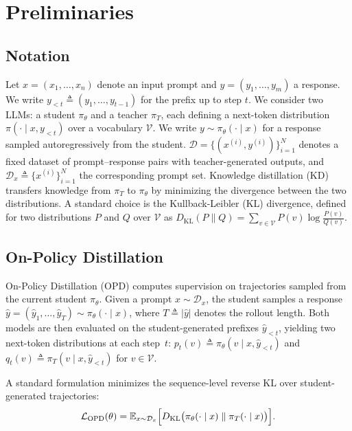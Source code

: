 \section{Preliminaries}

\subsection{Notation}

Let $x = (x_1, \ldots, x_n)$ denote an input prompt and
$y = (y_1, \ldots, y_m)$ a response.
We write $y_{<t} \triangleq (y_1, \ldots, y_{t-1})$ for the
prefix up to step $t$.
We consider two LLMs: a student $\pi_\theta$
and a teacher $\pi_T$, each defining a next-token distribution
$\pi(\cdot \mid x, y_{<t})$ over a vocabulary $\mathcal{V}$.
We write $y \sim \pi_\theta(\cdot \mid x)$ for a response
sampled autoregressively from the student.
$\mathcal{D} = \{(x^{(i)}, y^{(i)})\}_{i=1}^N$ denotes a
fixed dataset of prompt–response pairs with teacher-generated
outputs, and
$\mathcal{D}_x \triangleq \{x^{(i)}\}_{i=1}^N$ the
corresponding prompt set. Knowledge distillation (KD) transfers knowledge from $\pi_T$ to $\pi_\theta$ 
by minimizing the divergence between the two distributions. A standard choice is 
the Kullback-Leibler (KL) divergence, defined for two distributions $P$ and 
$Q$ over $\mathcal{V}$ as $D_{\mathrm{KL}}(P \| Q) 
  = \sum_{v \in \mathcal{V}} P(v) \log \frac{P(v)}{Q(v)}$.





\subsection{On-Policy Distillation}
\label{sec:on_policy_distillation}

On-Policy Distillation (OPD) computes supervision on trajectories
sampled from the current student $\pi_\theta$. Given a prompt
$x \sim \mathcal{D}_x$, the student samples a response
$\hat{y} = (\hat{y}_1, \ldots, \hat{y}_{T})
  \sim \pi_\theta(\cdot \mid x)$,
where $T \triangleq |\hat{y}|$ denotes the rollout length.
Both models are then evaluated on the student-generated prefixes
$\hat{y}_{<t}$, yielding two next-token distributions at each
step~$t$:
$p_t(v) \triangleq \pi_\theta(v \mid x, \hat{y}_{<t})$ and
$q_t(v) \triangleq \pi_T(v \mid x, \hat{y}_{<t})$
for $v \in \mathcal{V}$.


A standard formulation minimizes the sequence-level reverse KL over
student-generated trajectories:
\begin{equation}
  \mathcal{L}_{\mathrm{OPD}}(\theta)
  =
  \mathbb{E}_{x \sim \mathcal{D}_x}
  \Bigl[
    D_{\mathrm{KL}}\bigl(\pi_\theta(\cdot \mid x)\;\|\;\pi_T(\cdot \mid x)\bigr)
  \Bigr].
  \label{eq:opd_seq_rkl_prelim}
\end{equation}

